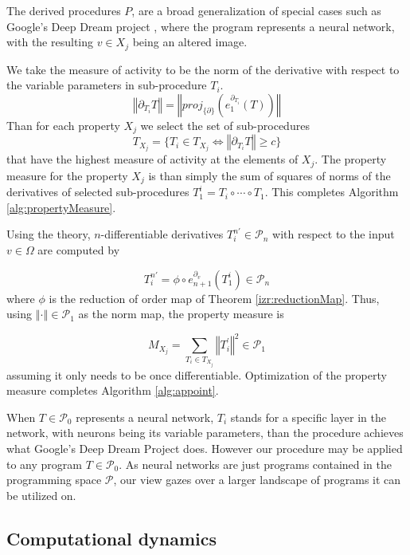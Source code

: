 \documentclass{article}
\newcommand{\dP}{\mathcal{P}}
\newcommand{\D}{\partial}
\begin{document}
   The derived procedures $P$, are a broad generalization of special cases such as Google's Deep Dream project \cite{DeepDream}, where the program represents a neural network, with the resulting $v\in X_j$ being an altered image.
   
   We take the measure of activity to be the norm of the derivative with respect to the variable parameters in sub-procedure $T_i$.
   $$\left\Vert\D_{T_i}T\right\Vert=\left\Vert proj_{\{\D\}}\left(e^{\D_{T_i}}_1(T)\right)\right\Vert$$
   Than for each property $X_j$ we select the set of sub-procedures 
   $$T_{X_j}=\{T_i\in T_{X_j}\iff \left\Vert\D_{T_i}T\right\Vert\ge c\}$$
   that have the highest measure of activity at the elements of $X_j$. The property measure for the property $X_j$ is than simply the sum of squares of norms of the derivatives of selected sub-procedures $T^i_1=T_i\circ\cdots\circ T_1$. This completes Algorithm \ref{alg:propertyMeasure}. 
   
   Using the theory, $n$-differentiable derivatives $T^{n\prime}_i\in\dP_n$ with respect to the input $v\in\Omega$ are computed by
   
   \begin{equation}
   T^{n\prime}_i=\phi\circ e^{\D_v}_{n+1}(T^i_1)\in\dP_n
   \end{equation}
   where $\phi$ is the reduction of order map of Theorem \ref{izr:reductionMap}.
   Thus, using $\left\Vert\cdot\right\Vert\in\dP_1$ as the norm map, the property measure is
   
   \begin{equation}
   M_{X_j}=\sum\limits_{T_i\in T_{X_j}} \left\Vert T^\prime_i\right\Vert^2\in\dP_1
   \end{equation}
   assuming it only needs to be once differentiable. Optimization of the property measure completes Algorithm \ref{alg:appoint}.
   
   When $T\in\dP_0$ represents a neural network, $T_i$ stands for a specific layer in the network, with neurons being its variable parameters, than the procedure achieves what Google's Deep Dream Project \cite{DeepDream} does. However our procedure may be applied to any program $T\in\dP_0$. As neural networks are just programs contained in the programming space $\dP$, our view gazes over a larger landscape of programs it can be utilized on.
   
\subsection{Computational dynamics}
\end{document}
